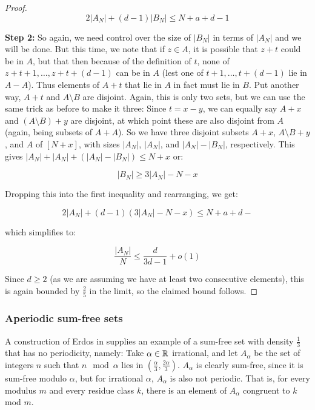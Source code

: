 \documentclass{article}
\theoremstyle{definition}
\theoremstyle{remark}
\numberwithin{equation}{section}
\begin{document}
\begin{proof}
\[2|A_N|+(d-1)|B_N| \leq N+a+d-1\]

\textbf{Step 2: }So again, we need control over the size of $|B_N|$ in
terms of $|A_N|$ and we will be done.  But this time, we note that if
$z \in A$, it is possible that $z+t$ could be in $A$, but that then
because of the definition of $t$, none of $z+t+1, \ldots, z+t+(d-1)$
can be in $A$ (lest one of $t+1, \ldots, t+(d-1)$ lie in $A-A$).  Thus
elements of $A+t$ that lie in $A$ in fact must lie in $B$.  Put another
way, $A+t$ and $A \setminus B$ are disjoint.  Again, this is only two
sets, but we can use the same trick as before to make it three: Since
$t = x-y$, we can equally say $A+x$ and $(A \setminus B) + y$ are
disjoint, at which point these are also disjoint from $A$ (again,
being subsets of $A+A$).  So we have three disjoint subsets $A+x$,
$A \setminus B + y$, and $A$ of $[N+x]$, with sizes $|A_N|$, $|A_N|$,
and $|A_N|-|B_N|$, respectively.  This gives
$|A_N| + |A_N| + (|A_N| - |B_N|) \leq N+x$ or:

\[|B_N| \geq 3|A_N|-N-x\]

Dropping this into the first inequality and rearranging, we get:

\[2|A_N|+(d-1)(3|A_N|-N-x) \leq N+a+d-\]

which simplifies to: 

\[\frac{|A_N|}{N} \leq \frac{d}{3d-1} + o(1)\]

Since $d \geq 2$ (as we are assuming we have at least two consecutive
elements), this is again bounded by $\frac25$ in the limit, so the
claimed bound follows.
\end{proof}

\subsubsection{Aperiodic sum-free sets}

A construction of Erdos in \cite{erdos:spm1965} supplies an
example of a sum-free set with density $\frac13$ that has no
periodicity, namely: Take $\alpha \in \mathbb{R}$ irrational, and let
$A_\alpha$ be the set of integers $n$ such that $n \mod{\alpha}$ lies
in $\left(\frac \alpha 3, \frac {2\alpha}{3}\right)$.  $A_\alpha$ is
clearly sum-free, since it is sum-free modulo $\alpha$, but for
irrational $\alpha$, $A_\alpha$ is also not periodic.  That is, for
every modulus $m$ and every residue class $k$, there is an element of
$A_\alpha$ congruent to $k$ mod $m$.  
\end{document}
